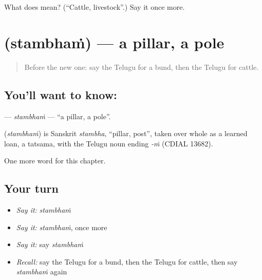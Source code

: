 \begin{tcolorbox}[breakable,colback=teal!4,colframe=teal!35!black,title={Before you move on}]
What does  mean? (\textquotedblleft{}Cattle, livestock\textquotedblright{}.) Say it once more.
\end{tcolorbox}
\section[\texorpdfstring{\te{స్తంభం} (stambhaṁ)}{స్తంభం (stambhaṁ)}]{ (stambhaṁ) — a pillar, a pole}

\label{lesson:TE-C309-stambham}



\begin{quote}
Before the new one: say the Telugu for a bund, then the Telugu for cattle.
\end{quote}

\subsection*{You'll want to know: }
\textbf{} — \emph{stambhaṁ} — \textquotedblleft{}a pillar, a pole\textquotedblright{}.

\begin{cousinweb}
\textbf{} (\emph{stambhaṁ}) is Sanskrit \emph{stambha}, \textquotedblleft{}pillar, post\textquotedblright{}, taken over whole as a learned loan, a tatsama, with the Telugu noun ending \emph{-ṁ} (CDIAL 13682).
\end{cousinweb}

\begin{grammarlens}[title={What you've built}]
One more word for this chapter.
\end{grammarlens}

\subsection*{Your turn}
\begin{itemize}
\raggedright
  \item \emph{Say it:} \emph{stambhaṁ}
  \item \emph{Say it:} \emph{stambhaṁ}, once more
  \item \emph{Say it:} say \emph{stambhaṁ}
  \item \emph{Recall:} say the Telugu for a bund, then the Telugu for cattle, then say \emph{stambhaṁ} again
\end{itemize}

